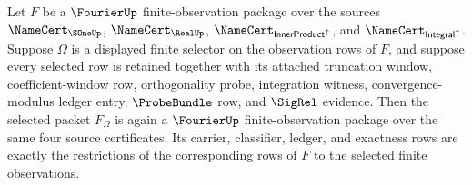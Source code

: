 \begin{theorem}
\label{thm:fourier-finite-observation-subpacket-restriction}
Let $F$ be a $\FourierUp$ finite-observation package over the sources $\NameCert_{\SOneUp}$, $\NameCert_{\RealUp}$, $\NameCert_{\mathsf{InnerProduct}^{\uparrow}}$, and $\NameCert_{\mathsf{Integral}^{\uparrow}}$. Suppose $\Omega$ is a displayed finite selector on the observation rows of $F$, and suppose every selected row is retained together with its attached truncation window, coefficient-window row, orthogonality probe, integration witness, convergence-modulus ledger entry, $\ProbeBundle$ row, and $\SigRel$ evidence. Then the selected packet $F_{\Omega}$ is again a $\FourierUp$ finite-observation package over the same four source certificates. Its carrier, classifier, ledger, and exactness rows are exactly the restrictions of the corresponding rows of $F$ to the selected finite observations.
\end{theorem}
